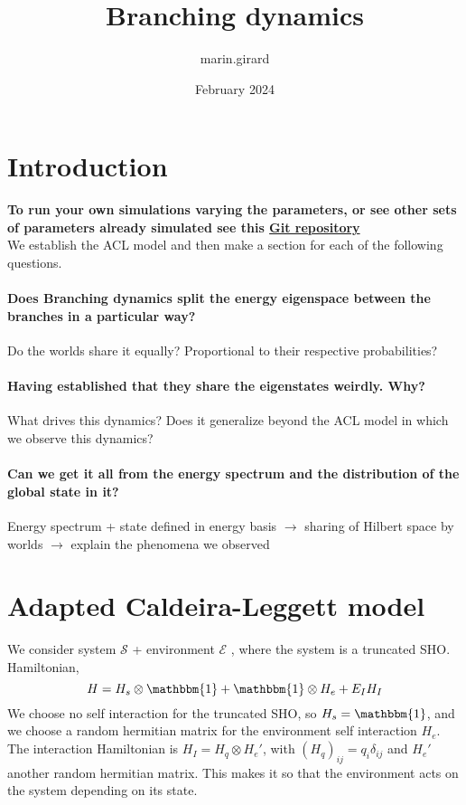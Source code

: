\documentclass{article}
\title{Branching dynamics}
\author{marin.girard }
\date{February 2024}
\begin{document}
\maketitle

\section{Introduction}

\textbf{To run your own simulations varying the parameters, or see other sets of parameters already simulated see this
\href{http://github.com/MarinAndreGirard/Quantum_Branching}{Git repository}}\\
We establish the ACL model and then make a section for each of the following questions.

\paragraph{Does Branching dynamics split the energy eigenspace between the branches in a particular way?}
Do the worlds share it equally? Proportional to their respective probabilities?

\paragraph{Having established that they share the eigenstates weirdly. Why?}
What drives this dynamics? Does it generalize beyond the ACL model in which we observe this dynamics?

\paragraph{Can we get it all from the energy spectrum and the distribution of the global state in it?}

Energy spectrum + state defined in energy basis $\rightarrow$ sharing of Hilbert space by worlds $\rightarrow$ explain the phenomena we observed

\section{Adapted Caldeira-Leggett model}

We consider system $\mathcal{S}$ + environment $\mathcal{E}$ , where the system is a truncated SHO. Hamiltonian,
\begin{equation}    
    H=H_s\otimes\mathbbm{1}+\mathbbm{1}\otimes H_e+E_IH_I
\end{equation}
We choose no self interaction for the truncated SHO, so $H_s=\mathbbm{1}$, and we choose a random hermitian matrix for the environment self interaction $H_e$. The interaction Hamiltonian is $H_I=H_q\otimes H_e'$, with $(H_q)_{ij}=q_i\delta_{ij}$ and $H_e'$ another random hermitian matrix. This makes it so that the environment acts on the system depending on its state. \\
\end{document}
